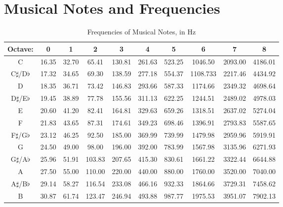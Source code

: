 \newpage

\section{Musical Notes and Frequencies}



\begin{center}

	
	\begin{table}[h]
		\caption{\label{tab:Frequencies}Frequencies of Musical Notes, in Hz}	
		\begin{tabular}{ |c | c | c | c | c | c | c | c | c |c|}
		
			\hline 
			\textbf{Octave:} & 0 & 1 & 2 &3&4&5&6&7&8 \\
			\hline 
			C & 16.35 & 32.70 & 65.41 & 130.81 & 261.63 & 523.25 & 1046.50 & 2093.00 & 4186.01 \\
			\hline
			C$\sharp$/D$\flat$& 17.32 & 34.65 & 69.30 & 138.59& 277.18 & 554.37 & 1108.733 & 2217.46 & 4434.92 \\
			\hline
			D & 18.35 & 36.71 & 73.42 & 146.83 & 293.66 & 587.33 & 1174.66 & 2349.32 & 4698.64 \\
			\hline
			D$\sharp$/E$\flat$& 19.45 &38.89 & 77.78& 155.56& 311.13& 622.25 & 1244.51& 2489.02& 4978.03 \\
			\hline
			E &	20.60&41.20&82.41&164.81&329.63&659.26&1318.51&2637.02&5274.04\\
			\hline
			F  & 21.83&	43.65&	87.31&	174.61&	349.23&	698.46&	1396.91&	2793.83& 5587.65 \\
			\hline
			F$\sharp$/G$\flat$& 23.12&	46.25&92.50& 185.00&369.99&	739.99&	1479.98&2959.96&5919.91 \\
			\hline
			G & 24.50&49.00&98.00&196.00&392.00&783.99&1567.98&3135.96&6271.93\\
			\hline
			G$\sharp$/A$\flat$& 25.96&51.91&103.83&207.65&415.30&830.61&1661.22&3322.44&6644.88\\
			\hline
			A &27.50&55.00&110.00&220.00&440.00&880.00&1760.00&3520.00&7040.00\\
			\hline
			A$\sharp$/B$\flat$ & 29.14&58.27&116.54&233.08&466.16&	932.33&1864.66&3729.31&7458.62\\
			\hline
			B& 30.87&61.74&123.47&246.94&493.88&987.77&1975.53&3951.07&7902.13\\
			\hline			
		\end{tabular}
	\end{table}
\end{center}

